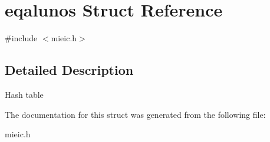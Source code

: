 \hypertarget{structeqalunos}{}\section{eqalunos Struct Reference}
\label{structeqalunos}


{\ttfamily \#include $<$mieic.\+h$>$}



\subsection{Detailed Description}
Hash table 

The documentation for this struct was generated from the following file\+:\begin{DoxyCompactItemize}
\item 
mieic.\+h\end{DoxyCompactItemize}
